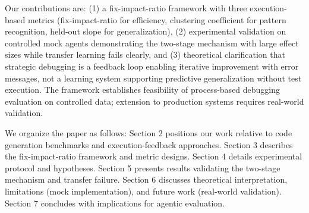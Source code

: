 Our contributions are: (1) a fix-impact-ratio framework with three execution-based metrics (fix-impact-ratio for efficiency, clustering coefficient for pattern recognition, held-out slope for generalization), (2) experimental validation on controlled mock agents demonstrating the two-stage mechanism with large effect sizes while transfer learning fails clearly, and (3) theoretical clarification that strategic debugging is a feedback loop enabling iterative improvement with error messages, not a learning system supporting predictive generalization without test execution. The framework establishes feasibility of process-based debugging evaluation on controlled data; extension to production systems requires real-world validation.

We organize the paper as follows: Section 2 positions our work relative to code generation benchmarks and execution-feedback approaches. Section 3 describes the fix-impact-ratio framework and metric designs. Section 4 details experimental protocol and hypotheses. Section 5 presents results validating the two-stage mechanism and transfer failure. Section 6 discusses theoretical interpretation, limitations (mock implementation), and future work (real-world validation). Section 7 concludes with implications for agentic evaluation.
